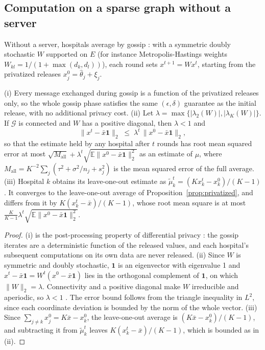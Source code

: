 \documentclass[acmsmall,screen,review]{acmart}
\theoremstyle{acmdefinition}
\begin{document}
\subsection{Computation on a sparse graph without a server}\label{sec:gossip}

Without a server, hospitals average by gossip \cite{boyd2006randomized,xiao2004fast}: with a symmetric doubly stochastic $W$ supported on $E$ (for instance Metropolis-Hastings weights $W_{kl}=1/(1+\max(d_k,d_l))$), each round sets $x^{t+1}=Wx^t$, starting from the privatized releases $x_j^0=\hat{\theta}_j+\xi_j$.

\begin{proposition}\label{prop:gossip}
(i) Every message exchanged during gossip is a function of the privatized releases only, so the whole gossip phase satisfies the same $(\epsilon,\delta)$ guarantee as the initial release, with no additional privacy cost. (ii) Let $\lambda=\max\{|\lambda_2(W)|,|\lambda_K(W)|\}$. If $\mathcal{G}$ is connected and $W$ has a positive diagonal, then $\lambda<1$ and
\[
\bigl\|x^t-\bar{x}\mathbf{1}\bigr\|_2\;\le\;\lambda^t\,\bigl\|x^0-\bar{x}\mathbf{1}\bigr\|_2,
\]
so that the estimate held by any hospital after $t$ rounds has root mean squared error at most $\sqrt{M_{\mathrm{all}}}+\lambda^t\sqrt{\mathbb{E}\|x^0-\bar{x}\mathbf{1}\|_2^2}$ as an estimate of $\mu$, where $M_{\mathrm{all}}=K^{-2}\sum_{j}(\tau^2+\sigma^2/n_j+s_j^2)$ is the mean squared error of the full average. (iii) Hospital $k$ obtains its leave-one-out estimate as $\tilde{\mu}_k^t=(Kx_k^t-x_k^0)/(K-1)$. It converges to the leave-one-out average of Proposition~\ref{prop:privatized}, and differs from it by $K(x_k^t-\bar{x})/(K-1)$, whose root mean square is at most $\frac{K}{K-1}\lambda^t\sqrt{\mathbb{E}\|x^0-\bar{x}\mathbf{1}\|_2^2}$.
\end{proposition}

\begin{proof}
(i) is the post-processing property of differential privacy \cite{dwork2014algorithmic}: the gossip iterates are a deterministic function of the released values, and each hospital's subsequent computations on its own data are never released. (ii) Since $W$ is symmetric and doubly stochastic, $\mathbf{1}$ is an eigenvector with eigenvalue 1 and $x^t-\bar{x}\mathbf{1}=W^t(x^0-\bar{x}\mathbf{1})$ lies in the orthogonal complement of $\mathbf{1}$, on which $\|W\|_2=\lambda$. Connectivity and a positive diagonal make $W$ irreducible and aperiodic, so $\lambda<1$ \cite{xiao2004fast}. The error bound follows from the triangle inequality in $L^2$, since each coordinate deviation is bounded by the norm of the whole vector. (iii) Since $\sum_{j\neq k}x_j^0=K\bar{x}-x_k^0$, the leave-one-out average is $(K\bar{x}-x_k^0)/(K-1)$, and subtracting it from $\tilde{\mu}_k^t$ leaves $K(x_k^t-\bar{x})/(K-1)$, which is bounded as in (ii).
\end{proof}
\end{document}
